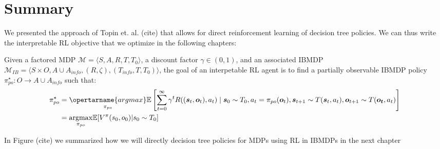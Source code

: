 \section{Summary}
We presented the approach of Topin et. al. (cite) that allows for direct reinforcement learning of decision tree policies.
We can thus write the interpretable RL objective that we optimize in the following chapters:
\begin{definition}
    Given a factored MDP $\mathcal{M}=\langle S, A, R, T, T_0 \rangle$, a discount factor $\gamma \in (0,1)$, and an associated IBMDP $\mathcal{M}_{IB}=\langle S \times O,A \cup A_{info}, (R, \zeta), (T_{info}, T, T_0)\rangle$, the goal of an interpetable RL agent is to find a partially observable IBMDP policy $\pi^\star_{po}:O\rightarrow A\cup A_{info}$ such that:
\begin{align*}
    \pi^\star_{po} &= \underset{\pi_{po}}{\opertarname{argmax}} \mathbb{E}\left[\sum_{t=0}^{\infty} \gamma^t R((\boldsymbol{s}_t, \boldsymbol{o}_t), a_t) \mid \boldsymbol{s}_0 \sim T_0, a_t = \pi_{po}(\boldsymbol{o}_t), \boldsymbol{s}_{t+1} \sim T(\boldsymbol{s}_t, a_t), \boldsymbol{o}_{t+1}\sim T(\boldsymbol{o_t}, a_t)\right]\\
    &= \underset{\pi_{po}}{\operatorname{argmax}} \mathbb{E}[V^{\pi}(s_0, o_0)| s_0\sim T_0]
\end{align*}
\end{definition}
In Figure (cite) we summarized how we will directly decision tree policies for MDPs using RL in IBMDPs in the next chapter
